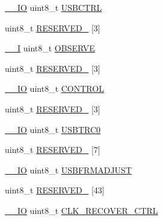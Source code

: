 \begin{DoxyCompactItemize}
\begin{tabbing}
\end{tabbing}\item 
\mbox{\hyperlink{core__cm4_8h_aec43007d9998a0a0e01faede4133d6be}{\+\_\+\+\_\+\+IO}} uint8\+\_\+t \mbox{\hyperlink{group___v_r_e_f___peripheral___access___layer_ga2fc819f4661814727300843a6c591223}{U\+S\+B\+C\+T\+RL}}
\item 
uint8\+\_\+t \mbox{\hyperlink{group___v_r_e_f___peripheral___access___layer_ga16bcb91413a3db4481d7d500e8e6f82b}{R\+E\+S\+E\+R\+V\+E\+D\+\_}} \mbox{[}3\mbox{]}
\item 
\mbox{\hyperlink{core__cm4_8h_af63697ed9952cc71e1225efe205f6cd3}{\+\_\+\+\_\+I}} uint8\+\_\+t \mbox{\hyperlink{group___v_r_e_f___peripheral___access___layer_ga25809d192dc2d1e4b676d5b6c935973f}{O\+B\+S\+E\+R\+VE}}
\item 
uint8\+\_\+t \mbox{\hyperlink{group___v_r_e_f___peripheral___access___layer_ga88d2f4b5276717d52836ada8b48997cf}{R\+E\+S\+E\+R\+V\+E\+D\+\_}} \mbox{[}3\mbox{]}
\item 
\mbox{\hyperlink{core__cm4_8h_aec43007d9998a0a0e01faede4133d6be}{\+\_\+\+\_\+\+IO}} uint8\+\_\+t \mbox{\hyperlink{group___v_r_e_f___peripheral___access___layer_gad042c540de71ddbe331a097886f11579}{C\+O\+N\+T\+R\+OL}}
\item 
uint8\+\_\+t \mbox{\hyperlink{group___v_r_e_f___peripheral___access___layer_ga3d696ac9cc19fd1715dfaa4d8b0871ae}{R\+E\+S\+E\+R\+V\+E\+D\+\_}} \mbox{[}3\mbox{]}
\item 
\mbox{\hyperlink{core__cm4_8h_aec43007d9998a0a0e01faede4133d6be}{\+\_\+\+\_\+\+IO}} uint8\+\_\+t \mbox{\hyperlink{group___v_r_e_f___peripheral___access___layer_gac89afa76ff77065c1cf493a11c82b831}{U\+S\+B\+T\+R\+C0}}
\item 
uint8\+\_\+t \mbox{\hyperlink{group___v_r_e_f___peripheral___access___layer_gaad6d5cb712dabba62eea5adf66b4f58e}{R\+E\+S\+E\+R\+V\+E\+D\+\_}} \mbox{[}7\mbox{]}
\item 
\mbox{\hyperlink{core__cm4_8h_aec43007d9998a0a0e01faede4133d6be}{\+\_\+\+\_\+\+IO}} uint8\+\_\+t \mbox{\hyperlink{group___v_r_e_f___peripheral___access___layer_gac817eb85b2155f60ef10f06dcb3b3adc}{U\+S\+B\+F\+R\+M\+A\+D\+J\+U\+ST}}
\item 
uint8\+\_\+t \mbox{\hyperlink{group___v_r_e_f___peripheral___access___layer_ga156410ff21a5fb0c8378dd1778a91cc9}{R\+E\+S\+E\+R\+V\+E\+D\+\_}} \mbox{[}43\mbox{]}
\item 
\mbox{\hyperlink{core__cm4_8h_aec43007d9998a0a0e01faede4133d6be}{\+\_\+\+\_\+\+IO}} uint8\+\_\+t \mbox{\hyperlink{group___v_r_e_f___peripheral___access___layer_gaa40fc6462cf87d4569e0039075b5890b}{C\+L\+K\+\_\+\+R\+E\+C\+O\+V\+E\+R\+\_\+\+C\+T\+RL}}

\end{DoxyCompactItemize}
